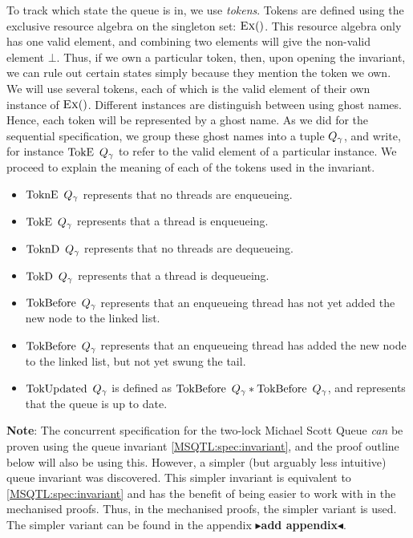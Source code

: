 \documentclass[twoside,11pt,openright]{report}
\newtheorem{definition}{Definition}[section]
\newcommand{\Qg}{Q_\gname}
\newcommand{\TokE}[1]{\operatorname{TokE}\ #1}
\newcommand{\TokEQg}{\TokE{\Qg}}
\newcommand{\ToknE}[1]{\operatorname{ToknE}\ #1}
\newcommand{\ToknEQg}{\ToknE{\Qg}}
\newcommand{\TokD}[1]{\operatorname{TokD}\ #1}
\newcommand{\TokDQg}{\TokD{\Qg}}
\newcommand{\ToknD}[1]{\operatorname{ToknD}\ #1}
\newcommand{\ToknDQg}{\ToknD{\Qg}}
\newcommand{\TokBefore}[1]{\operatorname{TokBefore}\ #1}
\newcommand{\TokBeforeQg}{\TokBefore{\Qg}}
\newcommand{\TokAfterQg}{\TokBefore{\Qg}}
\newcommand{\TokUpdated}[1]{\operatorname{TokUpdated}\ #1}
\newcommand{\TokUpdatedQg}{\TokUpdated{\Qg}}
\newcommand{\todo}[1]{{\color[rgb]{.5,0,0}\textbf{$\blacktriangleright$#1$\blacktriangleleft$}}}
\begin{document}
To track which state the queue is in, we use \textit{tokens}. Tokens are defined using the exclusive resource algebra on the singleton set: $\textsc{Ex}{()}$. This resource algebra only has one valid element, and combining two elements will give the non-valid element $\bot$. Thus, if we own a particular token, then, upon opening the invariant, we can rule out certain states simply because they mention the token we own.\\
We will use several tokens, each of which is the valid element of their own instance of $\textsc{Ex}{()}$. Different instances are distinguish between using ghost names. Hence, each token will be represented by a ghost name. As we did for the sequential specification, we group these ghost names into a tuple $\Qg$, and write, for instance $\TokEQg$ to refer to the valid element of a particular instance. We proceed to explain the meaning of each of the tokens used in the invariant.
\begin{itemize}
  \item $\ToknEQg$ represents that no threads are enqueueing.
  \item $\TokEQg$ represents that a thread is enqueueing.
  \item $\ToknDQg$ represents that no threads are dequeueing.
  \item $\TokDQg$ represents that a thread is dequeueing.
  \item $\TokBeforeQg$ represents that an enqueueing thread has not yet added the new node to the linked list.
  \item $\TokAfterQg$ represents that an enqueueing thread has added the new node to the linked list, but not yet swung the tail.
  \item $\TokUpdatedQg$ is defined as $\TokBeforeQg \ast \TokAfterQg$, and represents that the queue is up to date.
\end{itemize}


\textbf{Note}: The concurrent specification for the two-lock Michael Scott Queue \textit{can} be proven using the queue invariant \ref{MSQTL:spec:invariant}, and the proof outline below will also be using this. However, a simpler (but arguably less intuitive) queue invariant was discovered. This simpler invariant is equivalent to \ref{MSQTL:spec:invariant} and has the benefit of being easier to work with in the mechanised proofs. Thus, in the mechanised proofs, the simpler variant is used. The simpler variant can be found in the appendix \todo{add appendix}.
\end{document}
